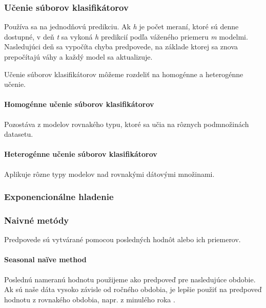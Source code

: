 \documentclass[a4paper,slovak,12pt,appendix]{article}
\begin{document}
\subsubsection{Učenie súborov klasifikátorov}
Používa sa na jednodňovú predikciu. Ak \textit{h} je počet meraní, ktoré sú
denne dostupné, v deň \textit{t} sa vykoná \textit{h} predikcií podľa váženého
priemeru \textit{m} modelmi. Nasledujúci deň sa vypočíta chyba predpovede,
na základe ktorej sa znova prepočítajú váhy a každý model sa
aktualizuje\cite{Grmanova2016}.

Učenie súborov klasifikátorov môžeme rozdeliť na homogénne a heterogénne učenie.

\paragraph{Homogénne učenie súborov klasifikátorov}
Pozostáva z modelov rovnakého typu, ktoré sa učia na rôznych podmnožinách
datasetu.
\paragraph{Heterogénne učenie súborov klasifikátorov}
Aplikuje rôzne typy modelov nad rovnakými dátovými množinami\cite{Grmanova2016}.


\subsubsection{Exponencionálne hladenie}


\subsubsection{Naivné metódy}
Predpovede sú vytvárané pomocou posledných hodnôt alebo ich priemerov.

\paragraph{Seasonal naïve method}
Poslednú nameranú hodnotu použijeme ako predpoveď pre nasledujúce obdobie. Ak
sú naše dáta vysoko závisle od ročného obdobia, je lepšie použiť na predpoveď
hodnotu z rovnakého obdobia, napr. z minulého roka \cite{Grmanova2016}.
\end{document}

